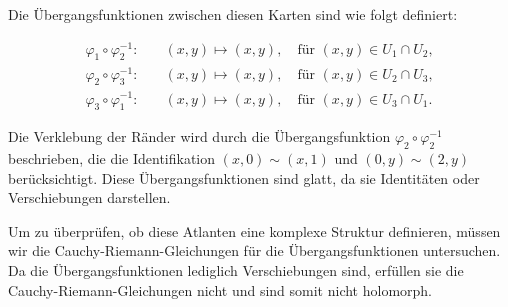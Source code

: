 \documentclass[11pt,a4paper]{article}
\begin{document}
Die Übergangsfunktionen zwischen diesen Karten sind wie folgt definiert:

\begin{align*}
\varphi_1 \circ \varphi_2^{-1}: \quad & (x,y) \mapsto (x,y), \quad \text{für } (x,y) \in U_1 \cap U_2, \\
\varphi_2 \circ \varphi_3^{-1}: \quad & (x,y) \mapsto (x,y), \quad \text{für } (x,y) \in U_2 \cap U_3, \\
\varphi_3 \circ \varphi_1^{-1}: \quad & (x,y) \mapsto (x,y), \quad \text{für } (x,y) \in U_3 \cap U_1.
\end{align*}

Die Verklebung der Ränder wird durch die Übergangsfunktion $\varphi_2 \circ \varphi_2^{-1}$ beschrieben, die die Identifikation $(x, 0) \sim (x, 1)$ und $(0, y) \sim (2, y)$ berücksichtigt. Diese Übergangsfunktionen sind glatt, da sie Identitäten oder Verschiebungen darstellen.

Um zu überprüfen, ob diese Atlanten eine komplexe Struktur definieren, müssen wir die Cauchy-Riemann-Gleichungen für die Übergangsfunktionen untersuchen. Da die Übergangsfunktionen lediglich Verschiebungen sind, erfüllen sie die Cauchy-Riemann-Gleichungen nicht und sind somit nicht holomorph.

\end{document}
